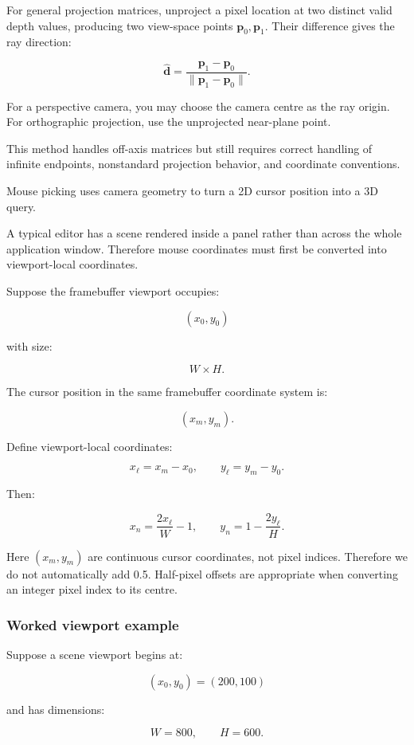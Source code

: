 For general projection matrices, unproject a pixel location at two distinct valid depth values, producing two view-space points \(\mathbf p_0,\mathbf p_1\). Their difference gives the ray direction:

\[ \boxed{ \hat{\mathbf d}= \frac{\mathbf p_1-\mathbf p_0} {\|\mathbf p_1-\mathbf p_0\|}. } \]

For a perspective camera, you may choose the camera centre as the ray origin. For orthographic projection, use the unprojected near-plane point.

This method handles off-axis matrices but still requires correct handling of infinite endpoints, nonstandard projection behavior, and coordinate conventions.

Mouse picking uses camera geometry to turn a 2D cursor position into a 3D query.

A typical editor has a scene rendered inside a panel rather than across the whole application window. Therefore mouse coordinates must first be converted into viewport-local coordinates.

Suppose the framebuffer viewport occupies:

\[ (x_0,y_0) \]

with size:

\[ W\times H. \]

The cursor position in the same framebuffer coordinate system is:

\[ (x_m,y_m). \]

Define viewport-local coordinates:

\[ \boxed{ x_\ell=x_m-x_0, \qquad y_\ell=y_m-y_0. } \]

Then:

\[ \boxed{ x_n=\frac{2x_\ell}{W}-1, \qquad y_n=1-\frac{2y_\ell}{H}. } \]

Here \((x_m,y_m)\) are continuous cursor coordinates, not pixel indices. Therefore we do not automatically add 0.5. Half-pixel offsets are appropriate when converting an integer pixel index to its centre.

\subsubsection{Worked viewport example}\label{worked-viewport-example}

Suppose a scene viewport begins at:

\[ (x_0,y_0)=(200,100) \]

and has dimensions:

\[ W=800,\qquad H=600. \]

